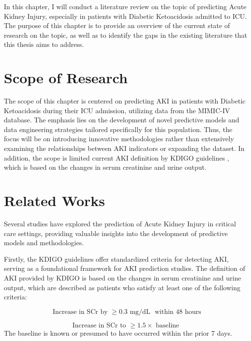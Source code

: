 \documentclass[../main.tex]{subfiles}
\begin{document}
\par In this chapter, I will conduct a literature review on the topic of predicting Acute Kidney Injury, especially in patients with Diabetic Ketoacidosis admitted to ICU. 
The purpose of this chapter is to provide an overview of the current state of research on the topic, as well as to identify the gaps in the existing literature that this thesis aims to address.


\section{Scope of Research}
The scope of this chapter is centered on predicting AKI in patients with Diabetic Ketoacidosis  during their ICU admission, utilizing data from the MIMIC-IV database. 
The emphasis lies on the development of novel predictive models and data engineering strategies tailored specifically for this population.
Thus, the focus will be on introducing innovative methodologies rather than extensively examining the relationships between AKI indicators or expanding the dataset.
In addition, the scope is limited current AKI definition by KDIGO guidelines \cite{kdigo-aki-guideline}, which is based on the changes in serum creatinine and urine output.


\section{Related Works}

Several studies have explored the prediction of Acute Kidney Injury in critical care settings, providing valuable insights into the development of predictive models and methodologies. 

Firstly, the KDIGO guidelines \cite{kdigo-aki-guideline} offer standardized criteria for detecting AKI, serving as a foundational framework for AKI prediction studies.
The definition of AKI provided by KDIGO is based on the changes in serum creatinine and urine output, which are described as patients who satisfy at least one of the following criteria:

\begin{equation}
    \text{ Increase in SCr by } \geq 0.3 \text{ mg/dL } \text{ within 48 hours}
\end{equation}

\begin{equation}
    \text{ Increase in SCr to } \geq 1.5 \times \text{ baseline }
\end{equation}
The baseline is known or presumed to have occurred within the prior 7 days.
\end{document}
